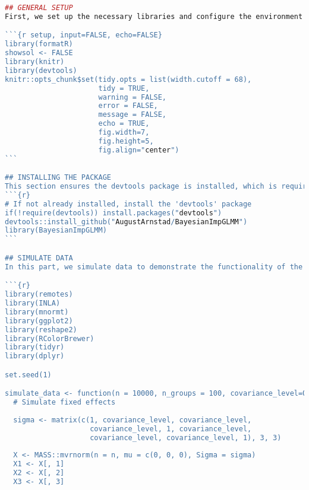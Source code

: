 
\begin{lstlisting}[language=R, caption=Usage of the BayesianImpGLMM package with plots and examples.]
## GENERAL SETUP
First, we set up the necessary libraries and configure the environment for our analysis. This includes loading essential packages and setting options for chunk output and plot dimensions."

```{r setup, input=FALSE, echo=FALSE}
library(formatR)
showsol <- FALSE
library(knitr)
library(devtools)
knitr::opts_chunk$set(tidy.opts = list(width.cutoff = 68), 
                      tidy = TRUE, 
                      warning = FALSE, 
                      error = FALSE, 
                      message = FALSE, 
                      echo = TRUE, 
                      fig.width=7, 
                      fig.height=5, 
                      fig.align="center")
```

## INSTALLING THE PACKAGE
This section ensures the devtools package is installed, which is required for installing packages from GitHub. We then install the BayesianImpGLMM package directly from GitHub using devtools::install_github(). In the package under the Hello.R file, all functions are defined with corresponding documentation.
```{r}
# If not already installed, install the 'devtools' package
if(!require(devtools)) install.packages("devtools")
devtools::install_github("AugustArnstad/BayesianImpGLMM")
library(BayesianImpGLMM)
```

## SIMULATE DATA
In this part, we simulate data to demonstrate the functionality of the BayesianImpGLMM package. We generate random variables used as fixed effects with different correlation structures and random effects. The data is then structured into data frames for further analysis. If you have a suitable dataset you can use this instead.

```{r}
library(remotes)
library(INLA)
library(mnormt)
library(ggplot2)
library(reshape2)
library(RColorBrewer)
library(tidyr)
library(dplyr)

set.seed(1)

simulate_data <- function(n = 10000, n_groups = 100, covariance_level=0) {
  # Simulate fixed effects
  
  sigma <- matrix(c(1, covariance_level, covariance_level, 
                    covariance_level, 1, covariance_level, 
                    covariance_level, covariance_level, 1), 3, 3)
  
  X <- MASS::mvrnorm(n = n, mu = c(0, 0, 0), Sigma = sigma)
  X1 <- X[, 1]
  X2 <- X[, 2]
  X3 <- X[, 3]


\end{lstlisting}

